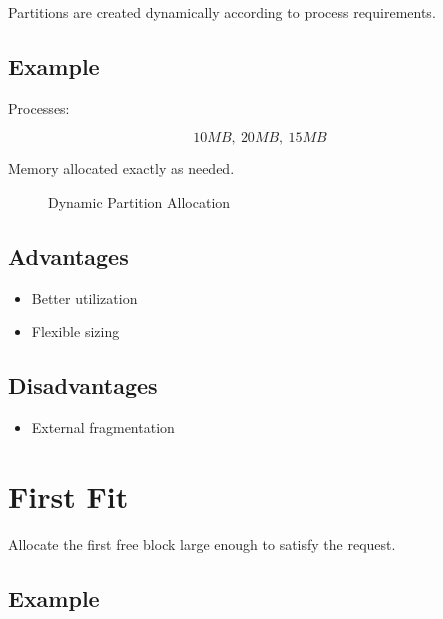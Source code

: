 Partitions are created dynamically according to process requirements.

\subsection{Example}

Processes:

\[
10MB,\ 20MB,\ 15MB
\]

Memory allocated exactly as needed.

\begin{figure}[H]
\centering
{}
\caption{Dynamic Partition Allocation}
\end{figure}

\subsection{Advantages}

\begin{itemize}
\item Better utilization
\item Flexible sizing
\end{itemize}

\subsection{Disadvantages}

\begin{itemize}
\item External fragmentation
\end{itemize}

\section{First Fit}

Allocate the first free block large enough to satisfy the request.

\subsection{Example}

